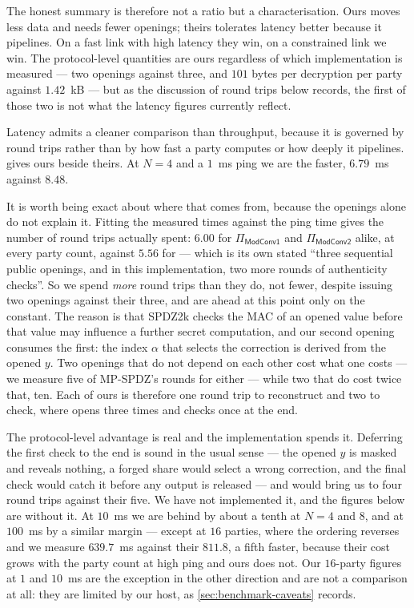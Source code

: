 The honest summary is therefore not a ratio but a characterisation.
Ours moves less data and needs fewer openings; theirs tolerates latency better because it pipelines.
On a fast link with high latency they win, on a constrained link we win.
The protocol-level quantities are ours regardless of which implementation is measured --- two openings against three, and $101$ bytes per decryption per party against $1.42$~kB --- but as the discussion of round trips below records, the first of those two is not what the latency figures currently reflect.

Latency admits a cleaner comparison than throughput, because it is governed by round trips rather than by how fast a party computes or how deeply it pipelines.
 gives ours beside theirs.
At $N = 4$ and a $1$~ms ping we are the faster, $6.79$~ms against $8.48$.

It is worth being exact about where that comes from, because the openings alone do not explain it.
Fitting the measured times against the ping time gives the number of round trips actually spent: $6.00$ for $\Pi_\mathsf{ModConv1}$ and $\Pi_\mathsf{ModConv2}$ alike, at every party count, against $5.56$ for \cite{CCS:ZZLP25} --- which is its own stated ``three sequential public openings, and in this implementation, two more rounds of authenticity checks''.
So we spend \emph{more} round trips than they do, not fewer, despite issuing two openings against their three, and are ahead at this point only on the constant.
The reason is that SPDZ2k checks the MAC of an opened value before that value may influence a further secret computation, and our second opening consumes the first: the index $\alpha$ that selects the correction is derived from the opened $y$.
Two openings that do not depend on each other cost what one costs --- we measure five of MP-SPDZ's rounds for either --- while two that do cost twice that, ten.
Each of ours is therefore one round trip to reconstruct and two to check, where \cite{CCS:ZZLP25} opens three times and checks once at the end.

The protocol-level advantage is real and the implementation spends it.
Deferring the first check to the end is sound in the usual sense --- the opened $y$ is masked and reveals nothing, a forged share would select a wrong correction, and the final check would catch it before any output is released --- and would bring us to four round trips against their five.
We have not implemented it, and the figures below are without it.
At $10$~ms we are behind by about a tenth at $N = 4$ and $8$, and at $100$~ms by a similar margin --- except at $16$ parties, where the ordering reverses and we measure $639.7$~ms against their $811.8$, a fifth faster, because their cost grows with the party count at high ping and ours does not.
Our $16$-party figures at $1$ and $10$~ms are the exception in the other direction and are not a comparison at all: they are limited by our host, as \cref{sec:benchmark-caveats} records.

